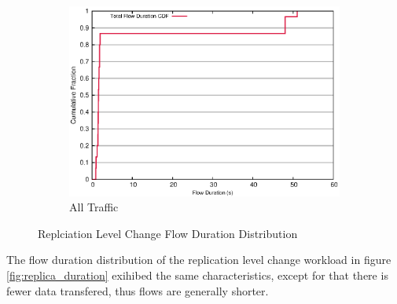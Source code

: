 \begin{figure}[!htbp]
\begin{subfigure}[b]{.55\linewidth}
   \centering
	\includegraphics[width=.99\textwidth]{figures/replica_change/flow_duration.eps}
	\caption{All Traffic}\label{fig:read_duration:all}
   \end{subfigure}%
\caption{Replciation Level Change Flow Duration Distribution}
\end{figure}

The flow duration distribution of the replication level change workload in figure \ref{fig:replica_duration} exihibed the same characteristics, except for that there is fewer data transfered, thus flows are generally shorter. 

